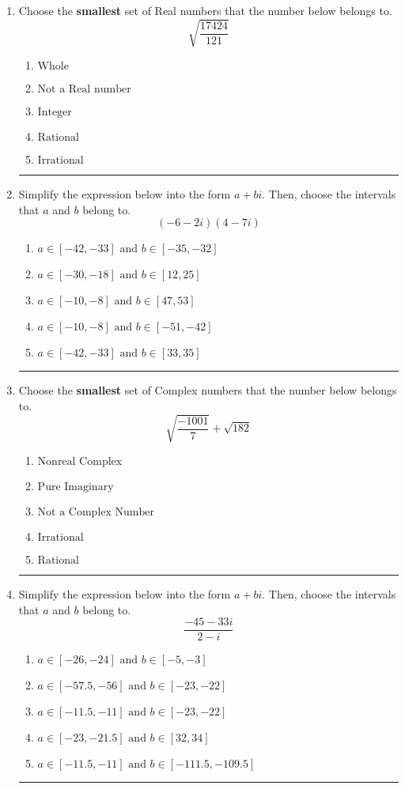 \documentclass[14pt]{extbook}
\newcommand{\litem}[1]{\item#1\hspace*{-1cm}\rule{\textwidth}{0.4pt}}
\begin{document}
\begin{enumerate}
\litem{
Choose the \textbf{smallest} set of Real numbers that the number below belongs to.\[ \sqrt{\frac{17424}{121}} \]\begin{enumerate}[label=\Alph*.]
\item \( \text{Whole} \)
\item \( \text{Not a Real number} \)
\item \( \text{Integer} \)
\item \( \text{Rational} \)
\item \( \text{Irrational} \)

\end{enumerate} }
\litem{
Simplify the expression below into the form $a+bi$. Then, choose the intervals that $a$ and $b$ belong to.\[ (-6 - 2 i)(4 - 7 i) \]\begin{enumerate}[label=\Alph*.]
\item \( a \in [-42, -33] \text{ and } b \in [-35, -32] \)
\item \( a \in [-30, -18] \text{ and } b \in [12, 25] \)
\item \( a \in [-10, -8] \text{ and } b \in [47, 53] \)
\item \( a \in [-10, -8] \text{ and } b \in [-51, -42] \)
\item \( a \in [-42, -33] \text{ and } b \in [33, 35] \)

\end{enumerate} }
\litem{
Choose the \textbf{smallest} set of Complex numbers that the number below belongs to.\[ \sqrt{\frac{-1001}{7}}+\sqrt{182} \]\begin{enumerate}[label=\Alph*.]
\item \( \text{Nonreal Complex} \)
\item \( \text{Pure Imaginary} \)
\item \( \text{Not a Complex Number} \)
\item \( \text{Irrational} \)
\item \( \text{Rational} \)

\end{enumerate} }
\litem{
Simplify the expression below into the form $a+bi$. Then, choose the intervals that $a$ and $b$ belong to.\[ \frac{-45 - 33 i}{2 - i} \]\begin{enumerate}[label=\Alph*.]
\item \( a \in [-26, -24] \text{ and } b \in [-5, -3] \)
\item \( a \in [-57.5, -56] \text{ and } b \in [-23, -22] \)
\item \( a \in [-11.5, -11] \text{ and } b \in [-23, -22] \)
\item \( a \in [-23, -21.5] \text{ and } b \in [32, 34] \)
\item \( a \in [-11.5, -11] \text{ and } b \in [-111.5, -109.5] \)


\end{enumerate}}
\end{enumerate}
\end{document}

